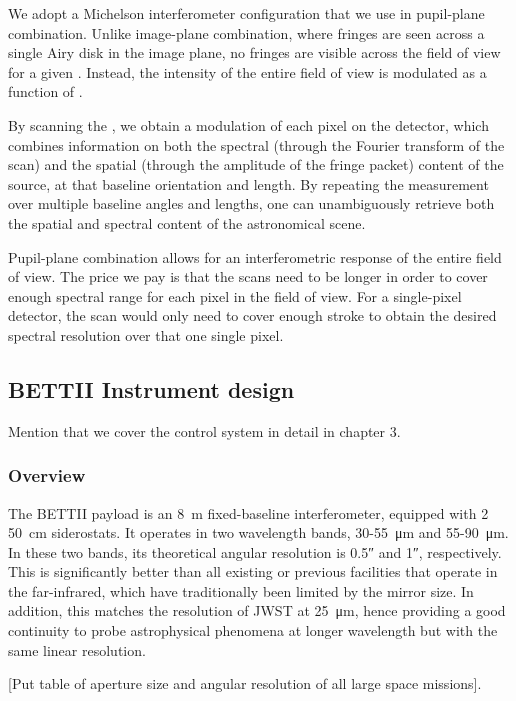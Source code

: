We adopt a Michelson interferometer configuration that we use in pupil-plane combination. Unlike image-plane combination, where fringes are seen across a single Airy disk in the image plane, no fringes are visible across the field of view for a given \OPD. Instead, the intensity of the entire field of view is modulated as a function of \OPD. 

By scanning the \OPD, we obtain a modulation of each pixel on the detector, which combines information on both the spectral (through the Fourier transform of the scan) and the spatial (through the amplitude of the fringe packet) content of the source, at that baseline orientation and length. By repeating the measurement over multiple baseline angles and lengths, one can unambiguously retrieve both the spatial and spectral content of the astronomical scene. 

Pupil-plane combination allows for an interferometric response of the entire field of view. The price we pay is that the \OPD scans need to be longer in order to cover enough spectral range for each pixel in the field of view. For a single-pixel detector, the \OPD scan would only need to cover enough stroke to obtain the desired spectral resolution over that one single pixel.


\subsection{BETTII Instrument design}

Mention that we cover the control system in detail in chapter 3.

\subsubsection{Overview}

The BETTII payload is an \SI{8}{\meter} fixed-baseline interferometer, equipped with 2 \SI{50}{\centi\meter} siderostats. It operates in two wavelength bands, 30-55~\si{\micro\meter} and 55-90~\si{\micro\meter}. In these two bands, its theoretical angular resolution is \ang{;;0.5} and \ang{;;1}, respectively. This is significantly better than all existing or previous facilities that operate in the far-infrared, which have traditionally been limited by the mirror size. In addition, this matches the resolution of JWST at \SI{25}{\micro\meter}, hence providing a good continuity to probe astrophysical phenomena at longer wavelength but with the same linear resolution.

[Put table of aperture size and angular resolution of all large space missions].

